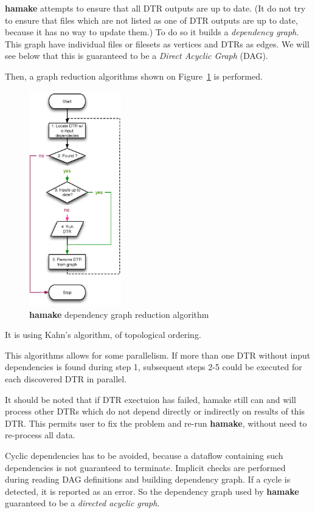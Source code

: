 \documentclass[10pt,conference,letterpaper]{IEEEtran}
\begin{document}
\textbf{hamake} attempts to ensure that all DTR outputs are up to
date. (It do not try to ensure that files which are not listed as one
of DTR outputs are up to date, because it has no way to update them.)
To do so it builds a \textit{dependency graph}. This graph have
individual files or filesets as vertices and DTRs as edges. We will
see below that this is guaranteed to be a \textit{Direct Acyclic
  Graph} (DAG).

Then, a graph reduction algorithms shown on Figure~\ref{fig:grred}
is performed.

\begin{figure}[htp]
\centering
\includegraphics[width=4cm]{GraphReduction.eps}
\caption{\textbf{hamake} dependency graph reduction algorithm}
\label{fig:grred}
\end{figure}

It is using Kahn's algorithm\cite{kahn1962topological}, of topological
ordering\cite{wiki:topsort}.

This algorithms allows for some parallelism. If more than one DTR
without input dependencies is found during step 1, subsequent steps
2-5 could be executed for each discovered DTR in parallel.

It should be noted that if DTR exectuion has failed, hamake still can
and will process other DTRs which do not depend directly or indirectly
on results of this DTR. This permits user to fix the problem and
re-run \textbf{hamake}, without need to re-process all data.

Cyclic dependencies has to be avoided, because a dataflow containing
such dependencies is not guaranteed to terminate. Implicit checks are
performed during reading DAG definitions and building dependency
graph. If a cycle is detected, it is reported as an error. So the
dependency graph used by \textbf{hamake} guaranteed to be a
\textit{directed acyclic graph}.
\end{document}
